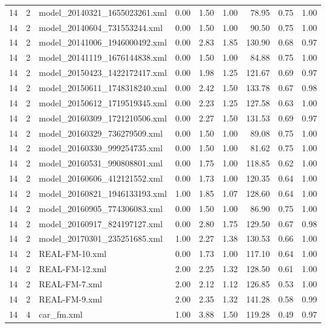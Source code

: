\begin{table}[ht]
\begin{tabular}{rrlrrrrrr}
   14 &   2 & model\_20140321\_1655023261.xml & 0.00 & 1.50 & 1.00 & 78.95 & 0.75 & 1.00 \\ 
   14 &   2 & model\_20140604\_731553244.xml & 0.00 & 1.50 & 1.00 & 90.50 & 0.75 & 1.00 \\ 
   14 &   2 & model\_20141006\_1946000492.xml & 0.00 & 2.83 & 1.85 & 130.90 & 0.68 & 0.97 \\ 
   14 &   2 & model\_20141119\_1676144838.xml & 0.00 & 1.50 & 1.00 & 84.88 & 0.75 & 1.00 \\ 
   14 &   2 & model\_20150423\_1422172417.xml & 0.00 & 1.98 & 1.25 & 121.67 & 0.69 & 0.97 \\ 
   14 &   2 & model\_20150611\_1748318240.xml & 0.00 & 2.42 & 1.50 & 133.78 & 0.67 & 0.98 \\ 
   14 &   2 & model\_20150612\_1719519345.xml & 0.00 & 2.23 & 1.25 & 127.58 & 0.63 & 1.00 \\ 
   14 &   2 & model\_20160309\_1721210506.xml & 0.00 & 2.27 & 1.50 & 131.53 & 0.69 & 0.97 \\ 
   14 &   2 & model\_20160329\_736279509.xml & 0.00 & 1.50 & 1.00 & 89.08 & 0.75 & 1.00 \\ 
   14 &   2 & model\_20160330\_999254735.xml & 0.00 & 1.50 & 1.00 & 81.62 & 0.75 & 1.00 \\ 
   14 &   2 & model\_20160531\_990808801.xml & 0.00 & 1.75 & 1.00 & 118.85 & 0.62 & 1.00 \\ 
   14 &   2 & model\_20160606\_412121552.xml & 0.00 & 1.73 & 1.00 & 120.35 & 0.64 & 1.00 \\ 
   14 &   2 & model\_20160821\_1946133193.xml & 1.00 & 1.85 & 1.07 & 128.60 & 0.64 & 1.00 \\ 
   14 &   2 & model\_20160905\_774306083.xml & 0.00 & 1.50 & 1.00 & 86.90 & 0.75 & 1.00 \\ 
   14 &   2 & model\_20160917\_824197127.xml & 0.00 & 2.80 & 1.75 & 129.50 & 0.67 & 0.98 \\ 
   14 &   2 & model\_20170301\_235251685.xml & 1.00 & 2.27 & 1.38 & 130.53 & 0.66 & 1.00 \\ 
   14 &   2 & REAL-FM-10.xml & 0.00 & 1.73 & 1.00 & 117.10 & 0.64 & 1.00 \\ 
   14 &   2 & REAL-FM-12.xml & 2.00 & 2.25 & 1.32 & 128.50 & 0.61 & 1.00 \\ 
   14 &   2 & REAL-FM-7.xml & 2.00 & 2.12 & 1.12 & 126.85 & 0.53 & 1.00 \\ 
   14 &   2 & REAL-FM-9.xml & 2.00 & 2.35 & 1.32 & 141.28 & 0.58 & 0.99 \\ 
   14 &   4 & car\_fm.xml & 1.00 & 3.88 & 1.50 & 119.28 & 0.49 & 0.97 \\ 

\end{tabular}
\end{table}
